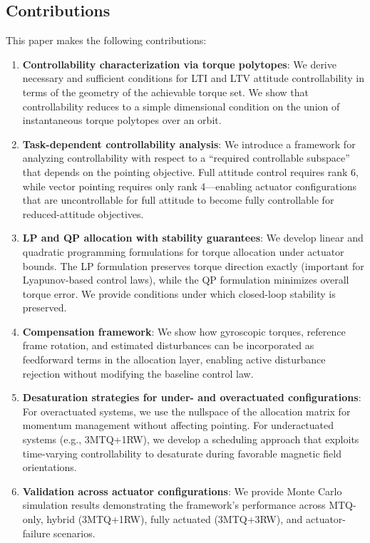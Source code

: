 \documentclass[conference]{IEEEtran}
\begin{document}
\subsection{Contributions}
This paper makes the following contributions:
\begin{enumerate}
    \item \textbf{Controllability characterization via torque polytopes}: We derive necessary and sufficient conditions for LTI and LTV attitude controllability in terms of the geometry of the achievable torque set. We show that controllability reduces to a simple dimensional condition on the union of instantaneous torque polytopes over an orbit.

    \item \textbf{Task-dependent controllability analysis}: We introduce a framework for analyzing controllability with respect to a ``required controllable subspace'' that depends on the pointing objective. Full attitude control requires rank 6, while vector pointing requires only rank 4---enabling actuator configurations that are uncontrollable for full attitude to become fully controllable for reduced-attitude objectives.

    \item \textbf{LP and QP allocation with stability guarantees}: We develop linear and quadratic programming formulations for torque allocation under actuator bounds. The LP formulation preserves torque direction exactly (important for Lyapunov-based control laws), while the QP formulation minimizes overall torque error. We provide conditions under which closed-loop stability is preserved.

    \item \textbf{Compensation framework}: We show how gyroscopic torques, reference frame rotation, and estimated disturbances can be incorporated as feedforward terms in the allocation layer, enabling active disturbance rejection without modifying the baseline control law.

    \item \textbf{Desaturation strategies for under- and overactuated configurations}: For overactuated systems, we use the nullspace of the allocation matrix for momentum management without affecting pointing. For underactuated systems (e.g., 3MTQ+1RW), we develop a scheduling approach that exploits time-varying controllability to desaturate during favorable magnetic field orientations.

    \item \textbf{Validation across actuator configurations}: We provide Monte Carlo simulation results demonstrating the framework's performance across MTQ-only, hybrid (3MTQ+1RW), fully actuated (3MTQ+3RW), and actuator-failure scenarios.
\end{enumerate}
\end{document}
